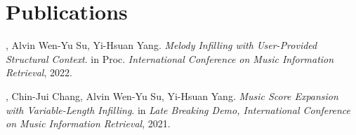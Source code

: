 
\section{Publications}
\begin{thebibliography}{1}
    , Alvin Wen-Yu Su, Yi-Hsuan Yang.
    \newblock \emph{Melody Infilling with User-Provided Structural Context}.
    \newblock in Proc. \emph{International Conference on Music Information Retrieval}, 2022.

    , Chin-Jui Chang, Alvin Wen-Yu Su, Yi-Hsuan Yang.
    \newblock \emph{Music Score Expansion with Variable-Length Infilling}.
    \newblock in \emph{Late Breaking Demo, International Conference on Music Information Retrieval}, 2021.

\end{thebibliography}


% 
% 



